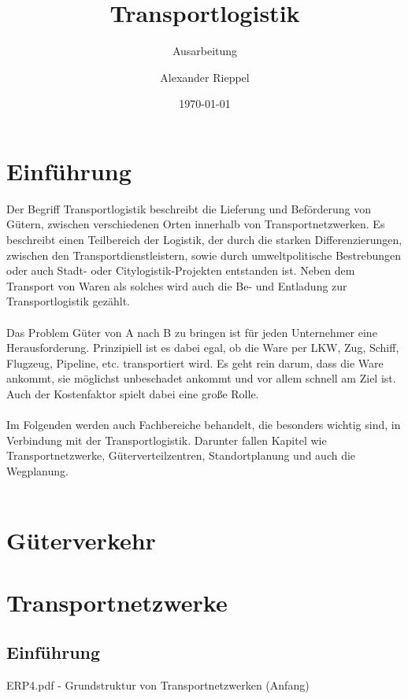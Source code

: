 \documentclass[a4paper,12pt]{scrreprt}
\begin{document}
\author{Alexander Rieppel} %
\title{Transportlogistik} %
\subject{Betriebs- und Informationsmanagement} %
\subtitle{Ausarbeitung} %
\date{\today} %
\publishers{5AHITT} %

\maketitle
\tableofcontents


\chapter{Einführung}
	Der Begriff Transportlogistik beschreibt die Lieferung und Beförderung von Gütern, zwischen verschiedenen Orten innerhalb von Transportnetzwerken. Es beschreibt einen Teilbereich der Logistik, der durch die starken Differenzierungen, zwischen den Transportdienstleistern, sowie durch umweltpolitische Bestrebungen oder auch Stadt- oder Citylogistik-Projekten entstanden ist. Neben dem Transport von Waren als solches wird auch die Be- und Entladung zur Transportlogistik gezählt. \\\\ 
	Das Problem Güter von A nach B zu bringen ist für jeden Unternehmer eine Herausforderung. Prinzipiell ist es dabei egal, ob die Ware per LKW, Zug, Schiff, Flugzeug, Pipeline, etc. transportiert wird. Es geht rein darum, dass die Ware ankommt, sie möglichst unbeschadet ankommt und vor allem schnell am Ziel ist. Auch der Kostenfaktor spielt dabei eine große Rolle.\\\\
	Im Folgenden werden auch Fachbereiche behandelt, die besonders wichtig sind, in Verbindung mit der Transportlogistik. Darunter fallen Kapitel wie Transportnetzwerke, Güterverteilzentren, Standortplanung und auch die Wegplanung. \\\\
	
	\chapter{Güterverkehr}
	
	
	\chapter{Transportnetzwerke}
	\section{Einführung}
	ERP4.pdf - Grundstruktur von Transportnetzwerken (Anfang)
	
\end{document}

